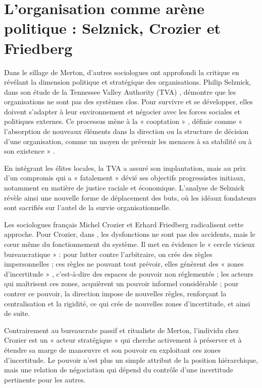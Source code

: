 \section{L'organisation comme arène politique : Selznick, Crozier et Friedberg}

Dans le sillage de Merton, d'autres sociologues ont approfondi la critique en révélant la dimension politique et stratégique des organisations.
Philip Selznick, dans son étude de la Tennessee Valley Authority (TVA) \citep{Selznick1950Tva}, démontre que les organisations ne sont pas des systèmes clos. Pour survivre et se développer, elles doivent s'adapter à leur environnement et négocier avec les forces sociales et politiques externes. Ce processus mène à la « cooptation » , définie comme « l'absorption de nouveaux éléments dans la direction ou la structure de décision d'une organisation, comme un moyen de prévenir les menaces à sa stabilité ou à son existence » .

En intégrant les élites locales, la TVA a assuré son implantation, mais au prix d'un compromis qui a « fatalement »  dévié ses objectifs progressistes initiaux, notamment en matière de justice raciale et économique. L'analyse de Selznick révèle ainsi une nouvelle forme de déplacement des buts, où les idéaux fondateurs sont sacrifiés sur l'autel de la survie organisationnelle.

Les sociologues français Michel Crozier et Erhard Friedberg radicalisent cette approche. Pour Crozier, dans \citep{Crozier1967Le}, les dysfonctions ne sont pas des accidents, mais le cœur même du fonctionnement du système. Il met en évidence le « cercle vicieux bureaucratique »  : pour lutter contre l'arbitraire, on crée des règles impersonnelles ; ces règles ne pouvant tout prévoir, elles génèrent des « zones d'incertitude » , c'est-à-dire des espaces de pouvoir non réglementés ; les acteurs qui maîtrisent ces zones, acquièrent un pouvoir informel considérable ; pour contrer ce pouvoir, la direction impose de nouvelles règles, renforçant la centralisation et la rigidité, ce qui crée de nouvelles zones d'incertitude, et ainsi de suite.

Contrairement au bureaucrate passif et ritualiste de Merton, l'individu chez Crozier est un « acteur stratégique »  qui cherche activement à préserver et à étendre sa marge de manœuvre et son pouvoir en exploitant ces zones d'incertitude. Le pouvoir n'est plus un simple attribut de la position hiérarchique, mais une relation de négociation qui dépend du contrôle d'une incertitude pertinente pour les autres.

